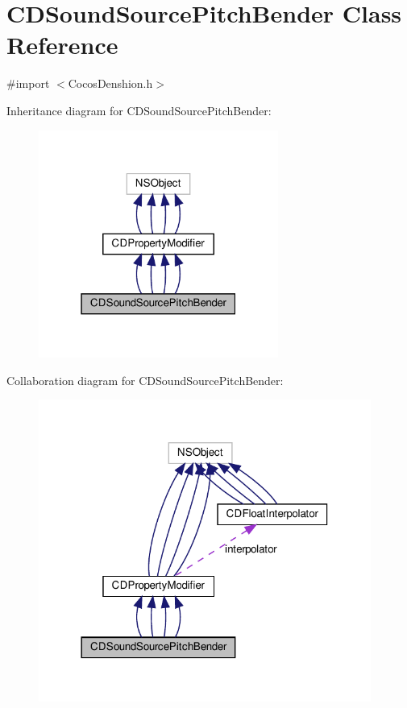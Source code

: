 \hypertarget{interfaceCDSoundSourcePitchBender}{}\section{C\+D\+Sound\+Source\+Pitch\+Bender Class Reference}
\label{interfaceCDSoundSourcePitchBender}


{\ttfamily \#import $<$Cocos\+Denshion.\+h$>$}



Inheritance diagram for C\+D\+Sound\+Source\+Pitch\+Bender\+:
\nopagebreak
\begin{figure}[H]
\begin{center}
\leavevmode
\includegraphics[width=223pt]{interfaceCDSoundSourcePitchBender__inherit__graph}
\end{center}
\end{figure}


Collaboration diagram for C\+D\+Sound\+Source\+Pitch\+Bender\+:
\nopagebreak
\begin{figure}[H]
\begin{center}
\leavevmode
\includegraphics[width=309pt]{interfaceCDSoundSourcePitchBender__coll__graph}
\end{center}
\end{figure}
